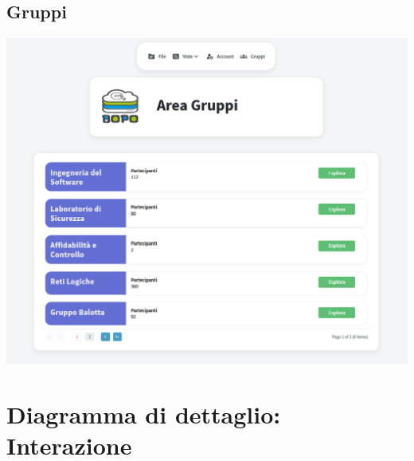 \subsection*{Gruppi}
{}
\vspace{3cm}
\begin{adjustwidth}{-3cm}{0cm}
\includegraphics[scale=0.75]{figs/gruppi.png}
\end{adjustwidth}
\pagecolor{background}\afterpage{\nopagecolor}







\section*{Diagramma di dettaglio: Interazione}
{}
\vspace{0.5cm}



